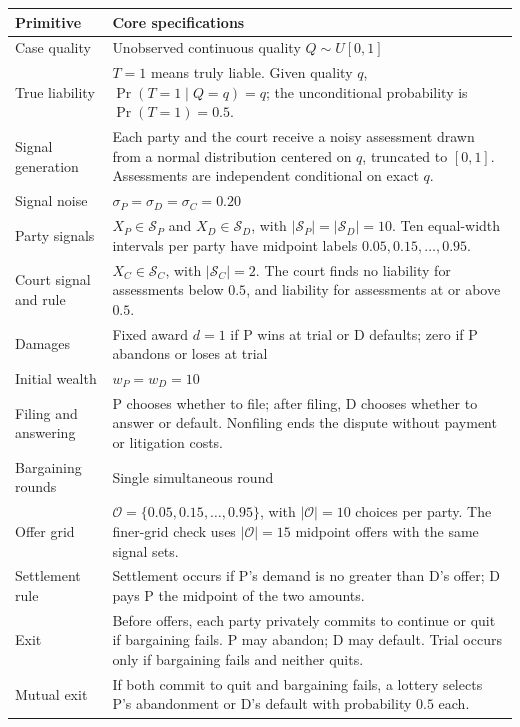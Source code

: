 \documentclass[10pt,border=5pt,varwidth=16cm]{standalone}
\begin{document}
\begin{minipage}{16cm}\small\setlength{\tabcolsep}{4pt}\renewcommand{\arraystretch}{1.15}
\begin{tabularx}{\linewidth}{@{}>{\raggedright\arraybackslash}p{3.2cm}>{\raggedright\arraybackslash}X@{}}
\toprule Primitive & Core specifications \\ \midrule
Case quality & Unobserved continuous quality $Q\sim U[0,1]$ \\
True liability & $T=1$ means truly liable. Given quality $q$, $\Pr(T=1\mid Q=q)=q$; the unconditional probability is $\Pr(T=1)=0.5$. \\
Signal generation & Each party and the court receive a noisy assessment drawn from a normal distribution centered on $q$, truncated to $[0,1]$. Assessments are independent conditional on exact $q$. \\
Signal noise & $\sigma_P=\sigma_D=\sigma_C=0.20$ \\
Party signals & $X_P\in\mathcal{S}_P$ and $X_D\in\mathcal{S}_D$, with $|\mathcal{S}_P|=|\mathcal{S}_D|=10$. Ten equal-width intervals per party have midpoint labels $0.05,0.15,\ldots,0.95$. \\
Court signal and rule & $X_C\in\mathcal{S}_C$, with $|\mathcal{S}_C|=2$. The court finds no liability for assessments below $0.5$, and liability for assessments at or above $0.5$. \\
Damages & Fixed award $d=1$ if P wins at trial or D defaults; zero if P abandons or loses at trial \\
Initial wealth & $w_P=w_D=10$ \\
Filing and answering & P chooses whether to file; after filing, D chooses whether to answer or default. Nonfiling ends the dispute without payment or litigation costs. \\
Bargaining rounds & Single simultaneous round \\
Offer grid & $\mathcal{O}=\{0.05,0.15,\ldots,0.95\}$, with $|\mathcal{O}|=10$ choices per party. The finer-grid check uses $|\mathcal{O}|=15$ midpoint offers with the same signal sets. \\
Settlement rule & Settlement occurs if P's demand is no greater than D's offer; D pays P the midpoint of the two amounts. \\
Exit & Before offers, each party privately commits to continue or quit if bargaining fails. P may abandon; D may default. Trial occurs only if bargaining fails and neither quits. \\
Mutual exit & If both commit to quit and bargaining fails, a lottery selects P's abandonment or D's default with probability $0.5$ each. \\

\end{tabularx}
\end{minipage}
\end{document}
